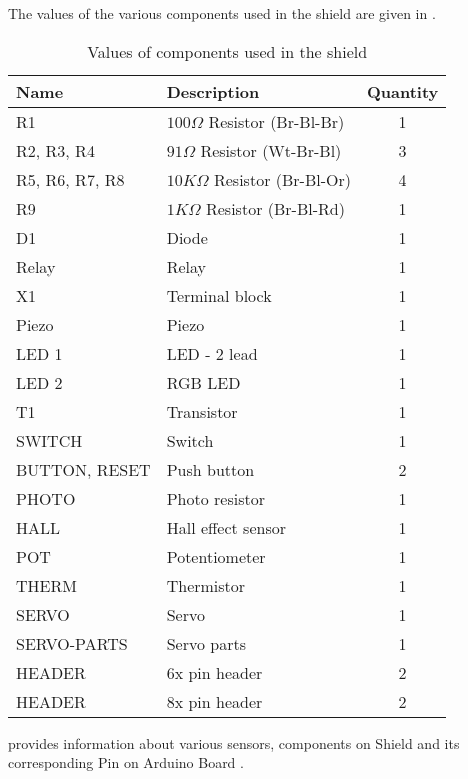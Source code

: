 The values of the various components used in the shield are given in 
.  
\begin{table}
\centering
\caption{Values of components used in the shield}
\label{tab:shield-values}
\begin{tabular}{|l|l|c|} \hline
Name & Description & Quantity \\ \hline
R1 & $100\Omega$ Resistor (Br-Bl-Br) & 1 \\ 
R2, R3, R4 & $91\Omega$ Resistor (Wt-Br-Bl) & 3 \\
R5, R6, R7, R8 & $10K\Omega$ Resistor (Br-Bl-Or) & 4 \\
R9 & $1K\Omega$ Resistor (Br-Bl-Rd) & 1 \\
D1 & Diode & 1 \\
Relay & Relay & 1 \\
X1 & Terminal block & 1 \\
Piezo & Piezo & 1 \\ 
LED 1 & LED - 2 lead & 1 \\
LED 2 & RGB LED & 1 \\
T1 & Transistor & 1 \\
SWITCH & Switch & 1 \\
BUTTON, RESET & Push button & 2 \\
PHOTO & Photo resistor & 1 \\
HALL & Hall effect sensor & 1 \\
POT & Potentiometer & 1 \\
THERM & Thermistor & 1 \\
SERVO & Servo & 1 \\
SERVO-PARTS & Servo parts & 1 \\
HEADER & 6x pin header & 2 \\
HEADER & 8x pin header & 2 \\
\hline
\end{tabular}
\end{table}
 provides information about various sensors,
components on Shield and its corresponding Pin on Arduino Board
\cite{shield-ref}.  
